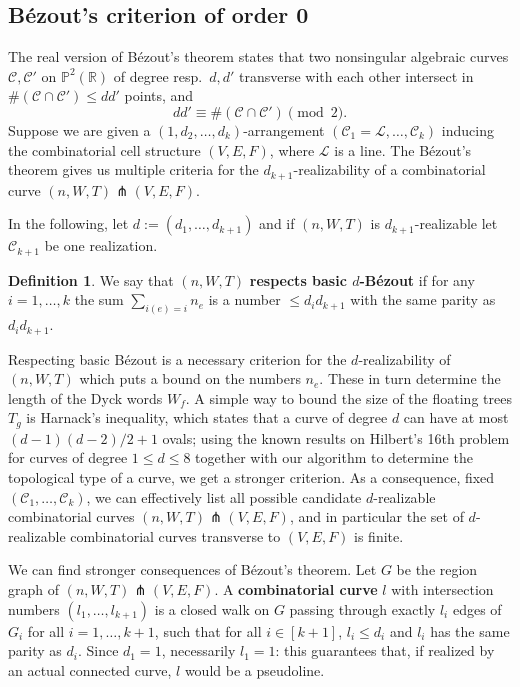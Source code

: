 \documentclass[11pt,reqno]{amsart}
\theoremstyle{plain}
\theoremstyle{definition}
\newtheorem{definition}[subsection]{Definition}
\theoremstyle{remark}
\numberwithin{equation}{subsection}
\newcommand*{\bbP}{\mathbb{P}}
\newcommand*{\bbR}{\mathbb{R}}
\newcommand*{\calC}{\mathcal{C}}
\newcommand*{\calL}{\mathcal{L}}
\begin{document}
\subsection{Bézout's criterion of order 0}\label{subsec:bezout0}

The real version of Bézout's theorem states that two nonsingular algebraic curves $\calC,\calC'$ on $\bbP^2(\bbR)$ of degree resp.\ $d,d'$ transverse with each other intersect in $\#(\calC\cap\calC')\le dd'$ points, and
\[dd'\equiv\#(\calC\cap\calC')\pmod{2}.\]
Suppose we are given a $(1,d_2,\dots,d_k)$-arrangement $(\calC_1=\calL,\dots,\calC_k)$ inducing the combinatorial cell structure $(V,E,F)$, where $\calL$ is a line. The Bézout's theorem gives us multiple criteria for the $d_{k+1}$-realizability of a combinatorial curve $(n,W,T)\pitchfork(V,E,F)$.

In the following, let $d:=(d_1,\dots,d_{k+1})$ and if $(n,W,T)$ is $d_{k+1}$-realizable let $\calC_{k+1}$ be one realization.

\begin{definition}
    We say that $(n,W,T)$ \textbf{respects basic $d$-Bézout} if for any $i=1,\dots,k$ the sum $\sum_{i(e)=i}n_e$ is a number $\le d_id_{k+1}$ with the same parity as $d_id_{k+1}$.
\end{definition}

Respecting basic Bézout is a necessary criterion for the $d$-realizability of $(n,W,T)$ which puts a bound on the numbers $n_e$. These in turn determine the length of the Dyck words $W_f$. A simple way to bound the size of the floating trees $T_g$ is Harnack's inequality, which states that a curve of degree $d$ can have at most $(d-1)(d-2)/2+1$ ovals; using the known results on Hilbert's 16th problem for curves of degree $1\le d\le 8$ together with our algorithm to determine the topological type of a curve, we get a stronger criterion. As a consequence, fixed $(\calC_1,\dots,\calC_k)$, we can effectively list all possible candidate $d$-realizable combinatorial curves $(n,W,T)\pitchfork(V,E,F)$, and in particular the set of $d$-realizable combinatorial curves transverse to $(V,E,F)$ is finite.

We can find stronger consequences of Bézout's theorem. Let $G$ be the region graph of $(n,W,T)\pitchfork(V,E,F)$. A \textbf{combinatorial curve} $l$ with intersection numbers $(l_1,\dots,l_{k+1})$ is a closed walk on $G$ passing through exactly $l_i$ edges of $G_i$ for all $i=1,\dots,k+1$, such that for all $i\in[k+1]$, $l_i\le d_i$ and $l_i$ has the same parity as $d_i$. Since $d_1=1$, necessarily $l_1=1$: this guarantees that, if realized by an actual connected curve, $l$ would be a pseudoline.
\end{document}
